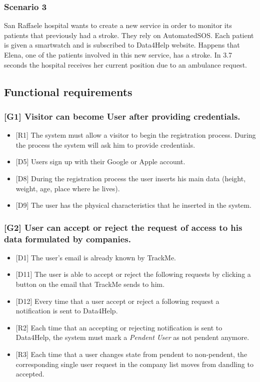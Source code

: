 \documentclass{article}
\begin{document}
\subsubsection{Scenario 3}
San Raffaele hospital wants to create a new service in order to monitor its patients that previously had a stroke. They rely on AutomatedSOS. Each patient is given a smartwatch and is subscribed to Data4Help website. Happens that Elena, one of the patients involved in this new service, has a stroke. In 3.7 seconds the hospital receives her current position due to an ambulance request.
\subsection{Functional requirements}
\subsubsection{[G1] Visitor can become User after providing credentials.}
\begin{itemize}
\item {[R1]} The system must allow a visitor to begin the registration process. During the process the system will ask him to provide credentials.
\item {[D5]} Users sign up with their Google or Apple account.
\item {[D8]} During the registration process the user inserts his main data (height, weight, age, place where he lives).
\item {[D9]} The user has the physical characteristics that he inserted in the system.
\end{itemize}
\subsubsection{[G2] User can accept or reject the request of access to his data formulated by companies.}
\begin{itemize}
\item {[D1]} The user's email is already known by TrackMe.
\item {[D11]} The user is able to accept or reject the following requests by clicking a button on the email that TrackMe sends to him.
\item {[D12]} Every time that a user accept or reject a following request a notification is sent to Data4Help.
\item {[R2]} Each time that an accepting or rejecting notification is sent to Data4Help, the system must mark a \emph{Pendent User} as not pendent anymore.
\item {[R3]} Each time that a user changes state from pendent to non-pendent, the corresponding single user request in the company list moves from dandling to accepted.
\end{itemize}
\end{document}
